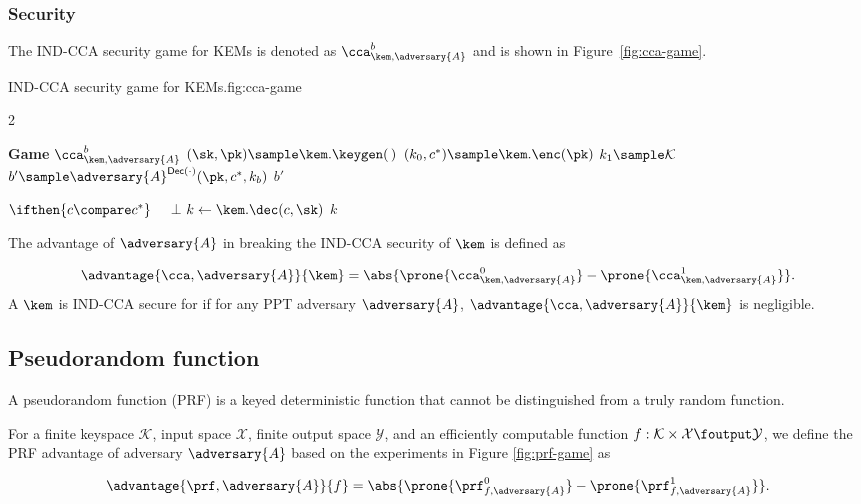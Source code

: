 \subsubsection{Security}

The IND-CCA security game for KEMs is denoted as $\cca^b_{\kem, \adversary{A}}$ and is shown in Figure~\ref{fig:cca-game}.

\begin{gamefigure}{IND-CCA security game for KEMs.}{fig:cca-game}
    \begin{games}{2}
        \begin{gameenv}{\textbf{Game} $\cca^b_{\kem, \adversary{A}}$}
            \State $(\sk, \pk) \sample \kem.\keygen(\,)$
            \State $(k_0, c^*) \sample \kem.\enc(\pk)$
            \State $k_1 \sample \mathcal{K}$
            \State $b' \sample \adversary{A}^{\mathsf{Dec(\cdot)}}(\pk, c^*, k_b)$
            \State \Return $b'$
        \end{gameenv}
        \gamebreak
        \begin{gameenv}{\oracledec}
            \State $\ifthen{c \compare c^*}$
                \State $\quad $\Return $\bot$
                \State $k \gets \kem.\dec(c, \sk)$
                \State \Return $k$
            \end{gameenv}
        \end{games}
    \end{gamefigure}


    \begin{definition}
        The advantage of $\adversary{A}$ in breaking the IND-CCA security of $\kem$ is defined as

        \[
            \advantage{\cca, \adversary{A}}{\kem} = \abs{\prone{\cca^0_{\kem, \adversary{A}}} - \prone{\cca^1_{\kem, \adversary{A}}}}.
        \]
        A $\kem$ is IND-CCA secure for if for any PPT adversary $\adversary{A}$, $\advantage{\cca, \adversary{A}}{\kem}$ is negligible.

    \end{definition}

    \subsection{Pseudorandom function}\label{sec:prf}
    A pseudorandom function (PRF) is a keyed deterministic function that cannot be distinguished from a truly random function.

    \begin{definition}
        \label{def:prf}
        For a finite keyspace $\mathcal{K}$, input space $\mathcal{X}$, finite output space $\mathcal{Y}$, and an efficiently computable function $f: \mathcal{K} \times \mathcal{X} \foutput \mathcal{Y}$, we define the PRF advantage of adversary $\adversary{A}$ based on the experiments in Figure \ref{fig:prf-game} as

        \[
            \advantage{\prf, \adversary{A}}{f} = \abs{\prone{\prf^0_{f, \adversary{A}}} - \prone{\prf^1_{f, \adversary{A}}}}.
        \]

    \end{definition}

